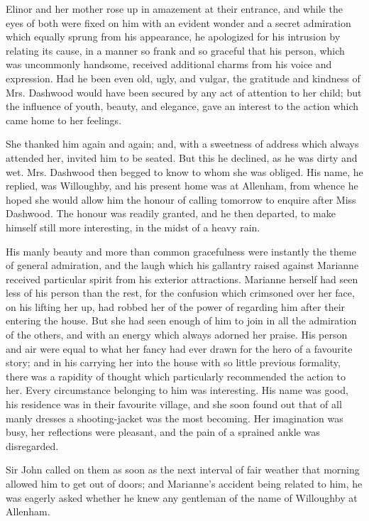 Elinor and her mother rose up in amazement at their entrance, and while the eyes of both were fixed on him with an evident wonder and a secret admiration which equally sprung from his appearance, he apologized for his intrusion by relating its cause, in a manner so frank and so graceful that his person, which was uncommonly handsome, received additional charms from his voice and expression. Had he been even old, ugly, and vulgar, the gratitude and kindness of Mrs. Dashwood would have been secured by any act of attention to her child; but the influence of youth, beauty, and elegance, gave an interest to the action which came home to her feelings.

She thanked him again and again; and, with a sweetness of address which always attended her, invited him to be seated. But this he declined, as he was dirty and wet. Mrs. Dashwood then begged to know to whom she was obliged. His name, he replied, was Willoughby, and his present home was at Allenham, from whence he hoped she would allow him the honour of calling tomorrow to enquire after Miss Dashwood. The honour was readily granted, and he then departed, to make himself still more interesting, in the midst of a heavy rain.

His manly beauty and more than common gracefulness were instantly the theme of general admiration, and the laugh which his gallantry raised against Marianne received particular spirit from his exterior attractions. Marianne herself had seen less of his person than the rest, for the confusion which crimsoned over her face, on his lifting her up, had robbed her of the power of regarding him after their entering the house. But she had seen enough of him to join in all the admiration of the others, and with an energy which always adorned her praise. His person and air were equal to what her fancy had ever drawn for the hero of a favourite story; and in his carrying her into the house with so little previous formality, there was a rapidity of thought which particularly recommended the action to her. Every circumstance belonging to him was interesting. His name was good, his residence was in their favourite village, and she soon found out that of all manly dresses a shooting-jacket was the most becoming. Her imagination was busy, her reflections were pleasant, and the pain of a sprained ankle was disregarded.

Sir John called on them as soon as the next interval of fair weather that morning allowed him to get out of doors; and Marianne's accident being related to him, he was eagerly asked whether he knew any gentleman of the name of Willoughby at Allenham.

